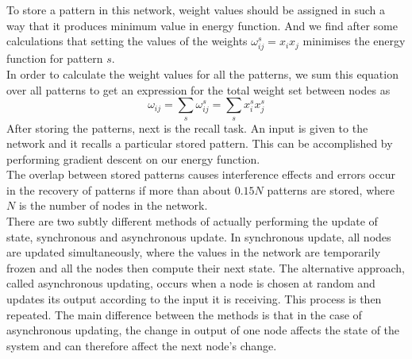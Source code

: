 \documentclass{article}
\begin{document}
\begin{flushleft}
{    To store a pattern in this network, weight values should be assigned in such a way that it produces minimum value in energy function. And we find after some calculations that setting the values of the weights $\omega_{ij}^{s}=x_i x_j$ minimises the energy function for pattern $s$.\\In 
order to calculate the weight values for all the patterns, we sum this 
equation over all patterns to get an expression for the total weight 
set between nodes as
    \begin{equation}
    \omega_{ij} = \sum_{s} \omega_{ij}^{s} = \sum_{s} x_i^{s}x_j^{s}
    \end{equation}
    After storing the patterns, next is the recall task. An input is given to the network and it recalls a particular stored pattern. This can be accomplished by performing gradient descent on our energy function. \\
    The overlap between stored patterns causes interference effects and errors occur in the recovery of patterns if more than about $0.15N$ patterns are stored, where $N$ is the number of nodes in the network.\\
    There are two subtly different methods of actually performing the update of state, synchronous and asynchronous update. In synchronous update, all nodes are updated simultaneously, where the values in the network are temporarily frozen and all the nodes then compute their next state. The alternative approach, called asynchronous updating, occurs when a node is chosen at random and updates its output according to the input it is receiving. This process is then repeated. The main difference between the methods is that in the case of asynchronous updating, the change in output of one node affects the state of the system and can therefore affect the next node’s change. \cite{Beale_Jackson_2017}
    
}
  
    \end{flushleft}
\end{document}
